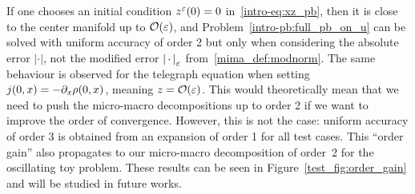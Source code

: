 %
If one chooses an initial condition $z^{\varepsilon}(0) = 0$ in~\eqref{intro-eq:xz_pb}, 
then it is close to the center manifold up to $\mathcal{O}(\varepsilon)$, 
and Problem~\eqref{intro-pb:full_pb_on_u} can be solved with uniform accuracy of order 2 
but only when considering the absolute error $|\cdot|$, 
not the modified error $\left\vert \,\cdot\, \right\vert _{\varepsilon}$ from~\eqref{mima_def:modnorm}. 
The same behaviour is observed for the telegraph equation when setting $j(0,x) = -\partial_{x} \rho(0,x) $, meaning $z = \mathcal{O}(\varepsilon)$. 
This would theoretically mean that we need to push the micro-macro 
decompositions up to order 2 if we want to improve the order of 
convergence. However, this is not the case: uniform accuracy of order 3 is 
obtained from an expansion of order 1 for all test cases. 
%
This ``order gain'' also propagates to our micro-macro decomposition of order~2 
for the oscillating toy problem. 
These results can be seen in Figure~\ref{test_fig:order_gain} 
and will be studied in future works. 

